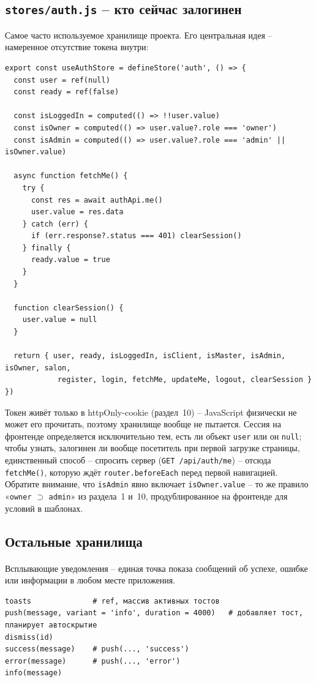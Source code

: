 \subsection{\texttt{stores/auth.js} -- кто сейчас залогинен}

Самое часто используемое хранилище проекта. Его центральная идея --
намеренное отсутствие токена внутри:
\begin{verbatim}
export const useAuthStore = defineStore('auth', () => {
  const user = ref(null)
  const ready = ref(false)

  const isLoggedIn = computed(() => !!user.value)
  const isOwner = computed(() => user.value?.role === 'owner')
  const isAdmin = computed(() => user.value?.role === 'admin' || isOwner.value)

  async function fetchMe() {
    try {
      const res = await authApi.me()
      user.value = res.data
    } catch (err) {
      if (err.response?.status === 401) clearSession()
    } finally {
      ready.value = true
    }
  }

  function clearSession() {
    user.value = null
  }

  return { user, ready, isLoggedIn, isClient, isMaster, isAdmin, isOwner, salon,
            register, login, fetchMe, updateMe, logout, clearSession }
})
\end{verbatim}
Токен живёт только в httpOnly-cookie (раздел~10) -- JavaScript физически
не может его прочитать, поэтому хранилище вообще не пытается. Сессия на
фронтенде определяется исключительно тем, есть ли объект \texttt{user}
или он \texttt{null}; чтобы узнать, залогинен ли вообще посетитель при
первой загрузке страницы, единственный способ -- спросить сервер
(\texttt{GET /api/auth/me}) -- отсюда \texttt{fetchMe()}, которую ждёт
\texttt{router.beforeEach} перед первой навигацией. Обратите внимание,
что \texttt{isAdmin} явно включает \texttt{isOwner.value} -- то же
правило «\texttt{owner} $\supset$ \texttt{admin}» из раздела~1
и~10, продублированное на фронтенде для условий в шаблонах.

\subsection{Остальные хранилища}

\paragraph{}
Всплывающие уведомления -- единая точка показа сообщений об успехе,
ошибке или информации в любом месте приложения.
\begin{verbatim}
toasts              # ref, массив активных тостов
push(message, variant = 'info', duration = 4000)   # добавляет тост, планирует автоскрытие
dismiss(id)
success(message)    # push(..., 'success')
error(message)      # push(..., 'error')
info(message)
\end{verbatim}

